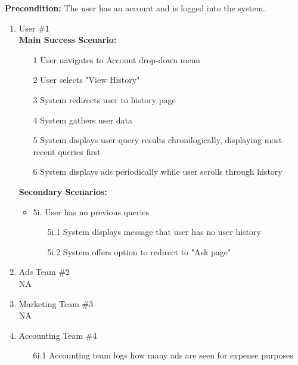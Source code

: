 \documentclass[]{article}
\begin{document}
\begin{enumerate}[{\bf BE1.}]
        \textbf{Precondition:} The user has an account and is logged into the system.
        \begin{enumerate}[{\bf VP1.}]
            \item User \#1 \\
                \textbf{Main Success Scenario:}
                \begin{enumerate}
                    \item[1] User navigates to Account drop-down menu
                    \item[2] User selects "View History"
                    \item[3] System redirects user to history page
                    \item[4] System gathers user data
                    \item[5] System displays user query results chronilogically, displaying most recent queries first
                    \item[6] System displays ads periodically while user scrolls through history
                \end{enumerate}
    
                \textbf{Secondary Scenarios:}
                \begin{itemize}
                    \item 5i. User has no previous queries
                    \begin{enumerate}
                        \item[5i.1] System displays message that user has no user history
                        \item[5i.2] System offers option to redirect to "Ask page" 
                    \end{enumerate}
                \end{itemize}
        
            \item Ads Team \#2 \\
                \newline NA
    
            \item Marketing Team \#3 \\
                \newline NA
                
            \item Accounting Team \#4 \\
            \begin{enumerate}
                \item [6i.1] Accounting team logs how many ads are seen for expense purposes
            \end{enumerate}
    

\end{enumerate}
\end{enumerate}
\end{document}

